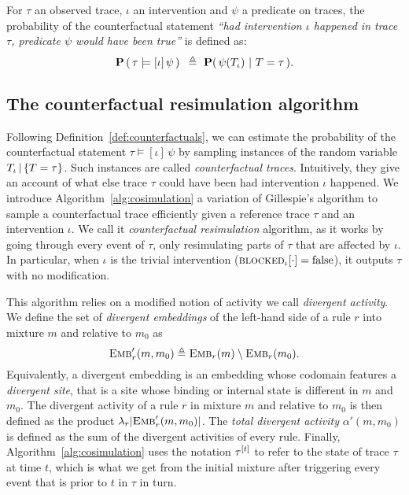 \begin{definition}\label{def:counterfactuals}
  For $\tau$ an observed trace, $\iota$ an intervention and $\psi$ a
  predicate on traces, the probability of the counterfactual statement
  \textit{``had intervention $\iota$ happened in trace $\tau$,
    predicate $\psi$ would have been true''} is defined as:
  \[ \mathbf{P}\left( \,\tau \models [\iota] \, \psi \,\right){} \ \triangleq \
    \mathbf{P}(\, \psi({T_\iota}{}) \ |\ T = \tau\,). \]
\end{definition}

\subsection{The counterfactual resimulation algorithm}

Following Definition~\ref{def:counterfactuals}, we can estimate the
probability of the counterfactual statement
$\tau \models [\iota] \, \psi$ by sampling instances of the random
variable ${T_\iota\,|\,\{T=\tau\}}{}$. Such instances are called \emph{counterfactual
  traces}. Intuitively, they give an account of what else trace
$\tau$ could have been had intervention $\iota$ happened.  We
introduce Algorithm~\ref{alg:cosimulation} a variation of Gillespie's
algorithm to sample a counterfactual trace efficiently given a
reference trace $\tau$ and an intervention $\iota$.  We call it
\emph{counterfactual resimulation} algorithm, as it works by going
through every event of $\tau$, only resimulating parts of $\tau$ that are
affected by $\iota$. In particular, when $\iota$ is the trivial
intervention (${\textsc{blocked}}_{\iota}[\cdot] = \text{false}$), it outputs
$\tau$ with no modification.

This algorithm relies on a modified notion of activity we call
\emph{divergent activity}. We define the set of \emph{divergent
  embeddings} of the left-hand side of a rule $r$ into mixture $m$
and relative to $m_0$ as
\[{\textsc{Emb}}'_{r}(m, m_0) \triangleq {\textsc{Emb}}_{r}(m) \setminus {\textsc{Emb}}_{r}(m_0).\]
Equivalently, a divergent embedding is an embedding whose codomain
features a \emph{divergent site}, that is a site whose binding or
internal state is different in $m$ and $m_0$. The {divergent activity}
of a rule $r$ in mixture $m$ and relative to $m_0$ is then defined as
the product $\lambda_r|{\textsc{Emb}}'_{r}(m, m_0)|$. The \emph{total divergent
  activity} $\alpha'(m, m_0)$ is defined as
the sum of the divergent activities of every rule. Finally,
Algorithm~\ref{alg:cosimulation} uses the notation $\tau^{[t]}$
to refer to the state of trace $\tau$ at time $t$, which is what we
get from the initial mixture after triggering every event that is
prior to $t$ in $\tau$ in turn.

